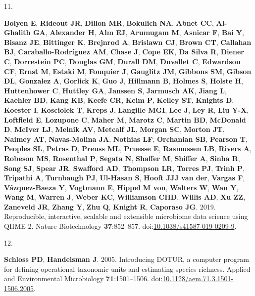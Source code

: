 \documentclass[
  11pt,
]{article}
\newlength{\cslhangindent}
\newlength{\csllabelwidth}
\newenvironment{CSLReferences}[2] %
 {\begin{list}{}{%
  \setlength{\itemindent}{0pt}
  \setlength{\leftmargin}{0pt}
  \setlength{\parsep}{0pt}
  \ifodd #1
   \setlength{\leftmargin}{\cslhangindent}
   \setlength{\itemindent}{-1\cslhangindent}
  \fi
  \setlength{\itemsep}{#2\baselineskip}}}
 {\end{list}}
\newcommand{\CSLLeftMargin}[1]{\parbox[t]{\csllabelwidth}{\strut#1\strut}}
\newcommand{\CSLRightInline}[1]{\parbox[t]{\linewidth - \csllabelwidth}{\strut#1\strut}}
\begin{document}
\begin{CSLReferences}{0}{1}
\CSLLeftMargin{11. }%
\CSLRightInline{\textbf{Bolyen E}, \textbf{Rideout JR}, \textbf{Dillon
MR}, \textbf{Bokulich NA}, \textbf{Abnet CC}, \textbf{Al-Ghalith GA},
\textbf{Alexander H}, \textbf{Alm EJ}, \textbf{Arumugam M},
\textbf{Asnicar F}, \textbf{Bai Y}, \textbf{Bisanz JE},
\textbf{Bittinger K}, \textbf{Brejnrod A}, \textbf{Brislawn CJ},
\textbf{Brown CT}, \textbf{Callahan BJ}, \textbf{Caraballo-Rodríguez
AM}, \textbf{Chase J}, \textbf{Cope EK}, \textbf{Da Silva R},
\textbf{Diener C}, \textbf{Dorrestein PC}, \textbf{Douglas GM},
\textbf{Durall DM}, \textbf{Duvallet C}, \textbf{Edwardson CF},
\textbf{Ernst M}, \textbf{Estaki M}, \textbf{Fouquier J},
\textbf{Gauglitz JM}, \textbf{Gibbons SM}, \textbf{Gibson DL},
\textbf{Gonzalez A}, \textbf{Gorlick K}, \textbf{Guo J},
\textbf{Hillmann B}, \textbf{Holmes S}, \textbf{Holste H},
\textbf{Huttenhower C}, \textbf{Huttley GA}, \textbf{Janssen S},
\textbf{Jarmusch AK}, \textbf{Jiang L}, \textbf{Kaehler BD},
\textbf{Kang KB}, \textbf{Keefe CR}, \textbf{Keim P}, \textbf{Kelley
ST}, \textbf{Knights D}, \textbf{Koester I}, \textbf{Kosciolek T},
\textbf{Kreps J}, \textbf{Langille MGI}, \textbf{Lee J}, \textbf{Ley R},
\textbf{Liu Y-X}, \textbf{Loftfield E}, \textbf{Lozupone C},
\textbf{Maher M}, \textbf{Marotz C}, \textbf{Martin BD},
\textbf{McDonald D}, \textbf{McIver LJ}, \textbf{Melnik AV},
\textbf{Metcalf JL}, \textbf{Morgan SC}, \textbf{Morton JT},
\textbf{Naimey AT}, \textbf{Navas-Molina JA}, \textbf{Nothias LF},
\textbf{Orchanian SB}, \textbf{Pearson T}, \textbf{Peoples SL},
\textbf{Petras D}, \textbf{Preuss ML}, \textbf{Pruesse E},
\textbf{Rasmussen LB}, \textbf{Rivers A}, \textbf{Robeson MS},
\textbf{Rosenthal P}, \textbf{Segata N}, \textbf{Shaffer M},
\textbf{Shiffer A}, \textbf{Sinha R}, \textbf{Song SJ}, \textbf{Spear
JR}, \textbf{Swafford AD}, \textbf{Thompson LR}, \textbf{Torres PJ},
\textbf{Trinh P}, \textbf{Tripathi A}, \textbf{Turnbaugh PJ},
\textbf{Ul-Hasan S}, \textbf{Hooft JJJ van der}, \textbf{Vargas F},
\textbf{Vázquez-Baeza Y}, \textbf{Vogtmann E}, \textbf{Hippel M von},
\textbf{Walters W}, \textbf{Wan Y}, \textbf{Wang M}, \textbf{Warren J},
\textbf{Weber KC}, \textbf{Williamson CHD}, \textbf{Willis AD},
\textbf{Xu ZZ}, \textbf{Zaneveld JR}, \textbf{Zhang Y}, \textbf{Zhu Q},
\textbf{Knight R}, \textbf{Caporaso JG}. 2019. Reproducible,
interactive, scalable and extensible microbiome data science using QIIME
2. Nature Biotechnology \textbf{37}:852--857.
doi:\href{https://doi.org/10.1038/s41587-019-0209-9}{10.1038/s41587-019-0209-9}.}

\CSLLeftMargin{12. }%
\CSLRightInline{\textbf{Schloss PD}, \textbf{Handelsman J}. 2005.
Introducing DOTUR, a computer program for defining operational taxonomic
units and estimating species richness. Applied and Environmental
Microbiology \textbf{71}:1501--1506.
doi:\href{https://doi.org/10.1128/aem.71.3.1501-1506.2005}{10.1128/aem.71.3.1501-1506.2005}.}

\end{CSLReferences}
\end{document}
